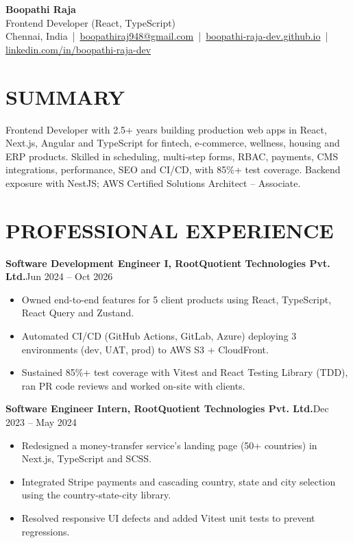 \documentclass[10pt,a4paper]{article}
\newcommand{\entry}[2]{\textbf{#1}\hfill #2\par}
\begin{document}
\begin{center}
{\LARGE\bfseries\color{navy} Boopathi Raja}\\[2pt]
Frontend Developer (React, TypeScript)\\[2pt]
Chennai, India \,|\, \href{mailto:boopathiraj948@gmail.com}{boopathiraj948@gmail.com} \,|\, \href{https://boopathi-raja-dev.github.io}{boopathi-raja-dev.github.io} \,|\,
\href{https://www.linkedin.com/in/boopathi-raja-dev}{linkedin.com/in/boopathi-raja-dev}
\end{center}

\section*{SUMMARY}
Frontend Developer with 2.5+ years building production web apps in React, Next.js, Angular and TypeScript for fintech, e-commerce, wellness, housing and ERP products. Skilled in scheduling, multi-step forms, RBAC, payments, CMS integrations, performance, SEO and CI/CD, with 85\%+ test coverage. Backend exposure with NestJS; AWS Certified Solutions Architect -- Associate.

\section*{PROFESSIONAL EXPERIENCE}
\entry{Software Development Engineer I, RootQuotient Technologies Pvt. Ltd.}{Jun 2024 -- Oct 2026}
\begin{itemize}
  \item Owned end-to-end features for 5 client products using React, TypeScript, React Query and Zustand.
  \item Automated CI/CD (GitHub Actions, GitLab, Azure) deploying 3 environments (dev, UAT, prod) to AWS S3 + CloudFront.
  \item Sustained 85\%+ test coverage with Vitest and React Testing Library (TDD), ran PR code reviews and worked on-site with clients.
\end{itemize}
\vspace{2pt}
\entry{Software Engineer Intern, RootQuotient Technologies Pvt. Ltd.}{Dec 2023 -- May 2024}
\begin{itemize}
  \item Redesigned a money-transfer service's landing page (50+ countries) in Next.js, TypeScript and SCSS.
  \item Integrated Stripe payments and cascading country, state and city selection using the country-state-city library.
  \item Resolved responsive UI defects and added Vitest unit tests to prevent regressions.
\end{itemize}
\end{document}

